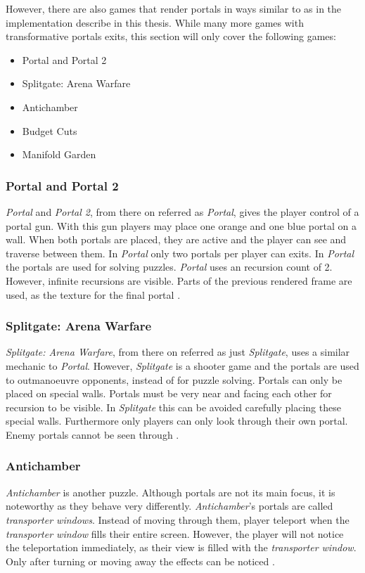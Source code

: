 However, there are also games that render portals in ways similar to as in the implementation describe in this thesis. While many more games with transformative portals exits, this section will only cover the following games:
\begin{itemize}
	\item Portal and Portal 2
	\item Splitgate: Arena Warfare
	\item Antichamber
	\item Budget Cuts
	\item Manifold Garden
	
	
\end{itemize}

\subsubsection{Portal and Portal 2}
\textit{Portal} and \textit{Portal 2}, from there on referred as \textit{Portal}, gives the player control of a portal gun. With this gun players may place one orange and one blue portal on a wall. When both portals are placed, they are active and the player can see and traverse between them. In \textit{Portal} only two portals per player can exits. In \textit{Portal} the portals are used for solving puzzles. \textit{Portal} uses an recursion count of 2. However, infinite recursions are visible. Parts of the previous rendered frame are used, as the texture for the final portal \cite{lecture:portalProblems}.

\subsubsection{Splitgate: Arena Warfare}
\textit{Splitgate: Arena Warfare}, from there on referred as just \textit{Splitgate}, uses a similar mechanic to \textit{Portal}. However, \textit{Splitgate} is a shooter game and the portals are used to outmanoeuvre opponents, instead of for puzzle solving. Portals can only be placed on special walls. Portals must be very near and facing each other for recursion to be visible. In \textit{Splitgate} this can be avoided carefully placing these special walls. Furthermore only players can only look through their own portal. Enemy portals cannot be seen through \cite{splitgate}.

\subsubsection{Antichamber}
\textit{Antichamber} is another puzzle. Although portals are not its main focus, it is noteworthy as they behave very differently. \textit{Antichamber}'s portals are called \textit{transporter windows}. Instead of moving through them, player teleport when the \textit{transporter window} fills their entire screen. However, the player will not notice the teleportation immediately, as their view is filled with the \textit{transporter window}. Only after turning or moving away the effects can be noticed \cite{antichamber}.

